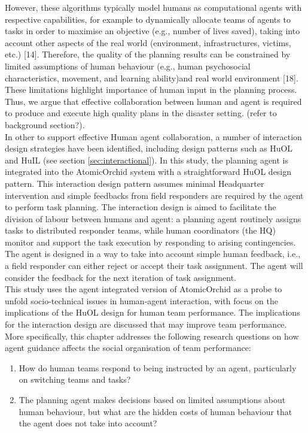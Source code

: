 However, these algorithms typically model humans as computational agents with respective capabilities, for example to dynamically allocate teams of agents to tasks in order to maximise an objective (e.g., number of lives saved), taking into account other aspects of the real world (environment, infrastructures, victims, etc.) [14]. Therefore, the quality of the planning results can be constrained by limited assumptions of human behaviour (e.g., human psychosocial characteristics, movement, and learning ability)and real world environment [18]. These limitations highlight importance of human input in the planning process. Thus, we argue that effective collaboration between human and agent is required to produce and execute high quality plans in the disaster setting. (refer to background section?). \\

In other to support effective Human agent collaboration, a number of interaction design strategies have been identified, including design patterns such as HuOL and HuIL (see section \ref{sec:interactional}). In this study, the planning agent is integrated into the AtomicOrchid system with a straightforward HuOL design pattern. This interaction design pattern assumes minimal Headquarter intervention and simple feedbacks from field responders are required by the agent to perform task planning. The interaction design is aimed to facilitate the division of labour between humans and agent: a planning agent routinely assigns tasks to distributed responder teams, while human coordinators (the HQ) monitor and support the task execution by responding to arising contingencies. The agent is designed in a way to take into account simple human feedback, i.e., a field responder can either reject or accept their task assignment. The agent will consider the feedback for the next iteration of task assignment.\\


This study uses the agent integrated version of AtomicOrchid as a probe to unfold socio-technical issues in human-agent interaction, with focus on the implications of the HuOL design for human team performance. The implications for the interaction design are discussed that may improve team performance. More specifically, this chapter addresses the following research questions on how agent guidance affects the social organisation of team performance:\\

\begin{enumerate}
\item How do human teams respond to being instructed by an agent, particularly on switching teams and tasks?\\
\item The planning agent makes decisions based on limited assumptions about human behaviour, but what are the hidden costs of human behaviour that the agent does not take into account?\\
\end{enumerate}


